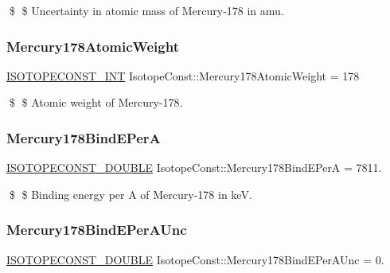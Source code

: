 \$ \$ Uncertainty in atomic mass of Mercury-\/178 in amu. \mbox{\label{group___isotope_const-_mercury-_hg178_gaffc8b176f783b561b95673c2c51cefa3}} 
\subsubsection{\texorpdfstring{Mercury178\+Atomic\+Weight}{Mercury178AtomicWeight}}
{\footnotesize\ttfamily \mbox{\hyperlink{group___isotope_const-_macros_ga5f18360b3e99483a35c32d789e62621c}{I\+S\+O\+T\+O\+P\+E\+C\+O\+N\+S\+T\+\_\+\+I\+NT}} Isotope\+Const\+::\+Mercury178\+Atomic\+Weight = 178}

\$ \$ Atomic weight of Mercury-\/178. \mbox{\label{group___isotope_const-_mercury-_hg178_ga284c589e39298255ab50982a3bfd3c1e}} 
\subsubsection{\texorpdfstring{Mercury178\+Bind\+E\+PerA}{Mercury178BindEPerA}}
{\footnotesize\ttfamily \mbox{\hyperlink{group___isotope_const-_macros_ga8f45a7272ce02c0b4c65c44636ed719a}{I\+S\+O\+T\+O\+P\+E\+C\+O\+N\+S\+T\+\_\+\+D\+O\+U\+B\+LE}} Isotope\+Const\+::\+Mercury178\+Bind\+E\+PerA = 7811.}

\$ \$ Binding energy per A of Mercury-\/178 in keV. \mbox{\label{group___isotope_const-_mercury-_hg178_gaf90c6d34e11208c63f8fe7d6506fb958}} 
\subsubsection{\texorpdfstring{Mercury178\+Bind\+E\+Per\+A\+Unc}{Mercury178BindEPerAUnc}}
{\footnotesize\ttfamily \mbox{\hyperlink{group___isotope_const-_macros_ga8f45a7272ce02c0b4c65c44636ed719a}{I\+S\+O\+T\+O\+P\+E\+C\+O\+N\+S\+T\+\_\+\+D\+O\+U\+B\+LE}} Isotope\+Const\+::\+Mercury178\+Bind\+E\+Per\+A\+Unc = 0.}

